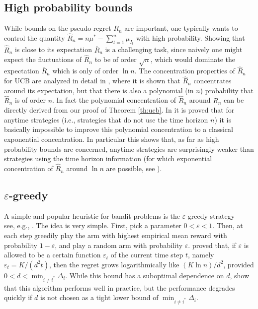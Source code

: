 \documentclass[11pt]{hackednow}
\newcommand{\oR}{\overline{R}}
\renewcommand{\epsilon}{\varepsilon}
\newcommand{\ve}{\varepsilon}
\begin{document}
\subsection{High probability bounds}
While bounds on the pseudo-regret $\oR_n$ are important, one typically wants to control the quantity $\hat{R}_n = n \mu^* - \sum_{t=1}^n \mu_{I_t}$ with high probability. Showing that $\hat{R}_n$ is close to its expectation $\oR_n$ is a challenging task, since naively one might expect the fluctuations of $\hat{R}_n$ to be of order $\sqrt{n}$, which would dominate the expectation $\oR_n$ which is only of order $\ln n$. The concentration properties of $\hat{R}_n$ for UCB are analyzed in detail in \cite{AMS09}, where it is shown that $\hat{R}_n$ concentrates around its expectation, but that there is also a polynomial (in $n$) probability that $\hat{R}_n$ is of order $n$. In fact the polynomial concentration of $\hat{R}_n$ around $\oR_n$ can be directly derived from our proof of Theorem \ref{th:ucb}. In \cite{SA11} it is proved that for anytime strategies (i.e., strategies that do not use the time horizon $n$) it is basically impossible to improve this polynomial concentration to a classical exponential concentration.
In particular this shows that, as far as high probability bounds are concerned, anytime strategies are surprisingly weaker than strategies using the time horizon information (for which exponential concentration of $\hat{R}_n$ around $\ln n$ are possible, see \cite{AMS09}). 


\subsection{$\epsilon$-greedy}
A simple and popular heuristic for bandit problems is the $\ve$-greedy strategy ---see, e.g., \cite{SB98}. The idea is very simple. First, pick a parameter $0 < \ve < 1$. Then, at each step greedily play the arm with highest empirical mean reward with probability $1-\ve$, and play a random arm with probability $\ve$. \cite{ACF02} proved that, if $\ve$ is allowed to be a certain function $\ve_t$ of the current time step $t$, namely $\ve_t = K/(d^2 t)$, then the regret grows logarithmically like $(K \ln n)/d^2$, provided $0 < d < \min_{i \neq i^*} \Delta_i$. While this bound has a suboptimal dependence on $d$, \cite{ACF02} show that this algorithm performs well in practice, but the performance degrades quickly if $d$ is not chosen as a tight lower bound of $\min_{i \neq i^*} \Delta_i$.
\end{document}
